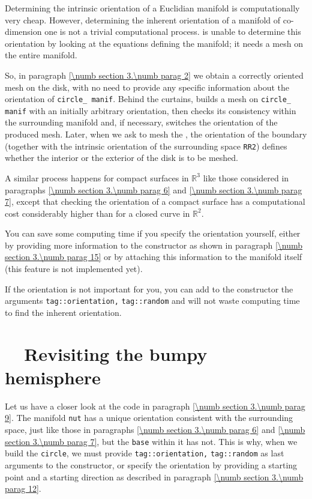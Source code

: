 Determining the intrinsic orientation of a Euclidian manifold is computationally
very cheap.
However, determining the inherent orientation of a manifold of co-dimension one is not
a trivial computational process.
{\ManiFEM} is unable to determine this orientation by looking at the equations defining
the manifold; it needs a mesh on the entire manifold.

So, in paragraph \ref{\numb section 3.\numb parag 2} we obtain a correctly oriented mesh
on the disk, with no need to provide any specific information about the orientation of
{\small\tt circle\_\,manif}.
Behind the curtains, {\maniFEM} builds a mesh on {\small\tt circle\_\,manif} with
an initially arbitrary orientation, then checks its consistency
within the surrounding manifold and, if necessary, switches the orientation of the produced mesh.
Later, when we ask {\maniFEM} to mesh the {\small\tt{}}, the orientation of the boundary
(together with the intrinsic orientation of the surrounding space {\small\tt RR2})
defines whether the interior or the exterior of the disk is to be meshed.

A similar process happens for compact surfaces in $ \mathbb{R}^3 $ like those
considered in paragraphs \ref{\numb section 3.\numb parag 6} and
\ref{\numb section 3.\numb parag 7},
except that checking the orientation of a compact surface has a computational cost
considerably higher than for a closed curve in $ \mathbb{R}^2 $.

You can save some computing time if you specify the orientation
yourself, either by providing more information to the {\small\tt{}} constructor as shown
in paragraph \ref{\numb section 3.\numb parag 15} or by attaching this information to
the manifold itself (this feature is not implemented yet).
 
If the orientation is not important for you, you can add to the {\small\tt{}} constructor
the arguments {\small\tt\textcolor{tag}{tag}::orientation,}
{\small\tt\textcolor{tag}{tag}::random} and {\maniFEM} will not waste
computing time to find the inherent orientation.


\section{~~Revisiting the bumpy hemisphere}\label{\numb section 3.\numb parag 14}

Let us have a closer look at the code in paragraph \ref{\numb section 3.\numb parag 9}.
The manifold {\small\tt nut} has a unique orientation consistent with the surrounding
space, just like those in paragraphs \ref{\numb section 3.\numb parag 6} and
\ref{\numb section 3.\numb parag 7}, but the {\small\tt base} within it has not.
This is why, when we build the {\small\tt circle}, we must provide
{\small\tt\textcolor{tag}{tag}::orientation,} {\small\tt\textcolor{tag}{tag}::random}
as last arguments to the {\small\tt{}} constructor,
or specify the orientation by providing a starting point and a starting direction
as described in paragraph \ref{\numb section 3.\numb parag 12}.

